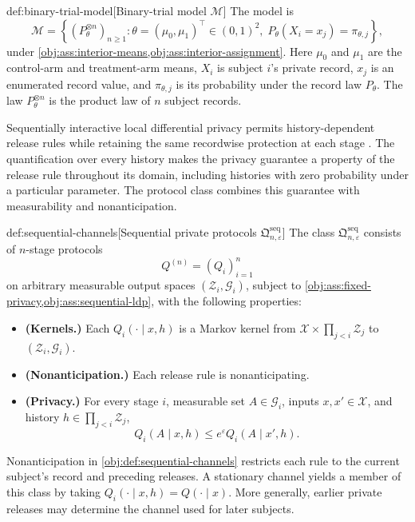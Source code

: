 \begin{definitionv}{def:binary-trial-model}[Binary-trial model \(\mathcal M\)]
The model is
\[
\mathcal M
=
\left\{
(P_\theta^{\otimes n})_{n\ge1}:
\theta=(\mu_0,\mu_1)^{\top}\in(0,1)^2,\;
P_\theta(X_i=x_j)=\pi_{\theta,j}
\right\},
\]
under \cref{obj:ass:interior-means,obj:ass:interior-assignment}.
Here \(\mu_0\) and \(\mu_1\) are the control-arm and treatment-arm means, \(X_i\) is subject \(i\)'s private record, \(x_j\) is an enumerated record value, and \(\pi_{\theta,j}\) is its probability under the record law \(P_\theta\). The law \(P_\theta^{\otimes n}\) is the product law of \(n\) subject records.
\end{definitionv}

Sequentially interactive local differential privacy permits history-dependent release rules while retaining the same recordwise protection at each stage \citep{Steinberger2024}. The quantification over every history makes the privacy guarantee a property of the release rule throughout its domain, including histories with zero probability under a particular parameter. The protocol class  combines this guarantee with measurability and nonanticipation.

\begin{definitionv}{def:sequential-channels}[Sequential private protocols $\mathfrak Q^{\mathrm{seq}}_{n,\varepsilon}$]
The class \(\mathfrak Q^{\mathrm{seq}}_{n,\varepsilon}\) consists of \(n\)-stage protocols
\[
Q^{(n)}=(Q_i)_{i=1}^n
\]
on arbitrary measurable output spaces \((\mathcal Z_i,\mathcal G_i)\), subject to \cref{obj:ass:fixed-privacy,obj:ass:sequential-ldp}, with the following properties:
\begin{itemize}
\item \textbf{(Kernels.)} Each \(Q_i(\cdot\mid x,h)\) is a Markov kernel from \(\mathcal X\times\prod_{j<i}\mathcal Z_j\) to \((\mathcal Z_i,\mathcal G_i)\).
\item \textbf{(Nonanticipation.)} Each release rule is nonanticipating.
\item \textbf{(Privacy.)} For every stage \(i\), measurable set \(A\in\mathcal G_i\), inputs \(x,x'\in\mathcal X\), and history \(h\in\prod_{j<i}\mathcal Z_j\),
\[
Q_i(A\mid x,h)\le e^\varepsilon Q_i(A\mid x',h).
\]
\end{itemize}
\end{definitionv}

Nonanticipation in \cref{obj:def:sequential-channels} restricts each rule to the current subject's record and preceding releases. A stationary channel yields a member of this class by taking \(Q_i(\cdot\mid x,h)=Q(\cdot\mid x)\). More generally, earlier private releases may determine the channel used for later subjects.

